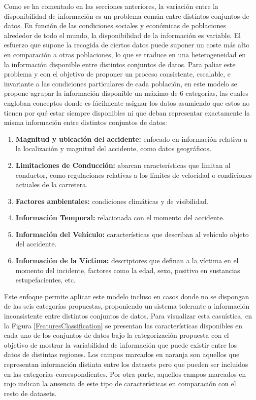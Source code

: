 \documentclass{uathesis-es}
\begin{document}
{		%
		
		Como se ha comentado en las secciones anteriores, la variación entre la disponibilidad de información es un problema común entre distintos conjuntos de datos. En función de las condiciones sociales y económicas de poblaciones alrededor de todo el mundo, la disponibilidad de la información es variable. El esfuerzo que supone la recogida de ciertos datos puede suponer un coste más alto en comparación a otras poblaciones, lo que se traduce en una heterogeneidad en la información disponible entre distintos conjuntos de datos. Para paliar este problema y con el objetivo de proponer un proceso consistente, escalable, e invariante a las condiciones particulares de cada población, en este modelo se propone agrupar la información disponible un máximo de 6 categorías, las cuales engloban conceptos donde es fácilmente asignar los datos asumiendo que estos no tienen por qué estar siempre disponibles ni que deban representar exactamente la misma información entre distintos conjuntos de datos:
		
		\begin{enumerate}
			\item \textbf{Magnitud y ubicación del accidente:} enfocado en información relativa a la localización y magnitud del accidente, como datos geográficos.
			\item \textbf{Limitaciones de Conducción:} abarcan características que limitan al conductor, como regulaciones relativas a los límites de velocidad o condiciones actuales de la carretera.
			\item \textbf{Factores ambientales:} condiciones climáticas y de visibilidad.
			\item \textbf{Información Temporal:} relacionada con el momento del accidente.
			\item \textbf{Información del Vehículo:} características que describan al vehículo objeto del accidente.
			\item \textbf{Información de la Víctima:} descriptores que definan a la víctima en el momento del incidente, factores como la edad, sexo, positivo en sustancias estupefacientes, etc.
		\end{enumerate}
		
		Este enfoque permite aplicar este modelo incluso en casos donde no se dispongan de las seis categorías propuestas, proponiendo un sistema tolerante a información inconsistente entre distintos conjuntos de datos. Para visualizar esta casuística, en la Figura \ref{FeaturesClassification} se presentan las características disponibles en cada uno de los conjuntos de datos bajo la categorización propuesta con el objetivo de mostrar la variabilidad de información que puede existir entre los datos de distintas regiones. Los campos marcados en naranja son aquellos que representan información distinta entre los datasets pero que pueden ser incluidos en las categorías correspondientes. Por otra parte, aquellos campos marcados en rojo indican la ausencia de este tipo de características en comparación con el resto de datasets.
		
}
\end{document}
